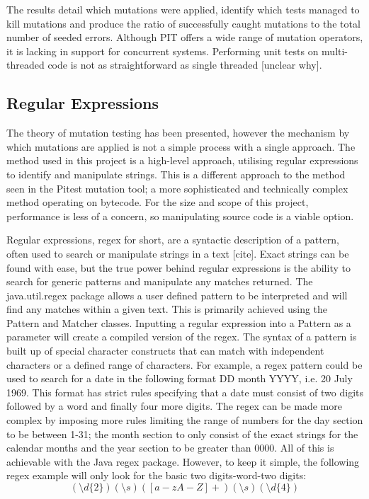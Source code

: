 \documentclass[a4paper,12pt]{article}
\begin{document}
The results detail which mutations were applied, identify which tests managed to kill mutations and produce the ratio of successfully caught mutations to the total number of seeded errors. Although PIT offers a wide range of mutation operators, it is lacking in support for concurrent systems. Performing unit tests on multi-threaded code is not as straightforward as single threaded [unclear why].


\subsection{Regular Expressions}    

The theory of mutation testing has been presented, however the mechanism by which mutations are applied is not a simple process with a single approach. The method used in this project is a high-level approach, utilising regular expressions to identify and manipulate strings. This is a different approach to the method seen in the Pitest mutation tool; a more sophisticated and technically complex method operating on bytecode. For the size and scope of this project, performance is less of a concern, so manipulating source code is a viable option. 

Regular expressions, regex for short, are a syntactic description of a pattern, often used to search or manipulate strings in a text [cite]. Exact strings can be found with ease, but the true power behind regular expressions is the ability to search for generic patterns and manipulate any matches returned. The java.util.regex package allows a user defined pattern to be interpreted and will find any matches within a given text. This is primarily achieved using the Pattern and Matcher classes. Inputting a regular expression into a Pattern as a parameter will create a compiled version of the regex. The syntax of a pattern is built up of special character constructs that can match with independent characters or a defined range of characters. For example, a regex pattern could be used to search for a date in the following format DD month YYYY, i.e. 20 July 1969. This format has strict rules specifying that a date must consist of two digits followed by a word and finally four more digits. The regex can be made more complex by imposing more rules limiting the range of numbers for the day section to be between 1-31; the month section to only consist of the exact strings for the calendar months and the year section to be greater than 0000. All of this is achievable with the Java regex package. However, to keep it simple, the following regex example will only look for the basic two digits-word-two digits:
\begin{equation}
    (\setminus d\{2\}) (\setminus s) ([a-zA-Z]+) (\setminus s) (\setminus d\{4\})
\end{equation}
\end{document}
